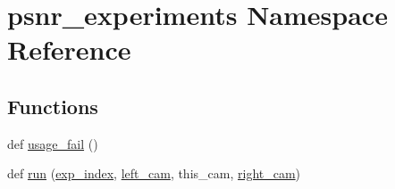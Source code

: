 \hypertarget{namespacepsnr__experiments}{}\section{psnr\+\_\+experiments Namespace Reference}
\label{namespacepsnr__experiments}
\subsection*{Functions}
\begin{DoxyCompactItemize}
\item 
def \hyperlink{namespacepsnr__experiments_a71c162efb1f4c9ac9d416b0fe18fa166}{usage\+\_\+fail} ()
\item 
def \hyperlink{namespacepsnr__experiments_a38a394d6318ffc25ddba2bb10a9016a7}{run} (\hyperlink{namespacepsnr__experiments_ac658a4900340b7cee6bed9c8e0fafe26}{exp\+\_\+index}, \hyperlink{namespacepsnr__experiments_a73bc4364dfa07a7d47d805235227b20b}{left\+\_\+cam}, this\+\_\+cam, \hyperlink{namespacepsnr__experiments_a920b8cd9a2b238288683cc42577e1e78}{right\+\_\+cam})
\end{DoxyCompactItemize}

